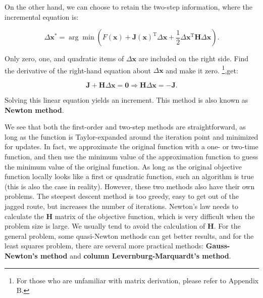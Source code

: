 On the other hand, we can choose to retain the two-step information, where the incremental equation is:

\begin{equation}
\Delta \bm{x}^* = \arg \min \left(F\left( \bm{x} \right) + \bm{J} \left( \bm{x} \right)^\mathrm{ T} \Delta \bm{x} + \frac{1}{2}\Delta {\bm{x}^\mathrm{T}}\bm{H} \Delta \bm{x} \right).
\end{equation}

Only zero, one, and quadratic items of $\Delta \bm{x}$ are included on the right side. Find the derivative of the right-hand equation about $\Delta \bm{x}$ and make it zero. \footnote{For those who are unfamiliar with matrix derivation, please refer to Appendix B. },get:

\begin{equation}
\bm{J} + \bm{H} \Delta \bm{x} = \bm{0} \Rightarrow
\bm{H} \Delta \bm{x} = -\bm{J}.
\end{equation}

Solving this linear equation yields an increment. This method is also known as \textbf{Newton method}.

We see that both the first-order and two-step methods are straightforward, as long as the function is Taylor-expanded around the iteration point and minimized for updates.
In fact, we approximate the original function with a one- or two-time function, and then use the minimum value of the approximation function to guess the minimum value of the original function.
As long as the original objective function locally looks like a first or quadratic function, such an algorithm is true (this is also the case in reality). However, these two methods also have their own problems. The steepest descent method is too greedy, easy to get out of the jagged route, but increases the number of iterations.
Newton's law needs to calculate the $\bm{H}$ matrix of the objective function, which is very difficult when the problem size is large.
We usually tend to avoid the calculation of $\bm{H}$. For the general problem, some quasi-Newton methods can get better results, and for the least squares problem, there are several more practical methods: \textbf{Gauss-Newton's method} and \textbf{column Levernburg-Marquardt's method}.
